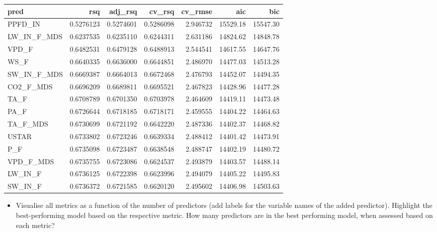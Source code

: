 \documentclass[
]{book}
\providecommand{\tightlist}{%
  \setlength{\itemsep}{0pt}\setlength{\parskip}{0pt}}
\begin{document}
\begin{tabular}{l|r|r|r|r|r|r}
\hline
pred & rsq & adj\_rsq & cv\_rsq & cv\_rmse & aic & bic\\
\hline
PPFD\_IN & 0.5276123 & 0.5274601 & 0.5286098 & 2.946732 & 15529.18 & 15547.30\\
\hline
LW\_IN\_F\_MDS & 0.6237535 & 0.6235110 & 0.6244311 & 2.631186 & 14824.62 & 14848.78\\
\hline
VPD\_F & 0.6482531 & 0.6479128 & 0.6488913 & 2.544541 & 14617.55 & 14647.76\\
\hline
WS\_F & 0.6640335 & 0.6636000 & 0.6644851 & 2.486970 & 14477.03 & 14513.28\\
\hline
SW\_IN\_F\_MDS & 0.6669387 & 0.6664013 & 0.6672468 & 2.476793 & 14452.07 & 14494.35\\
\hline
CO2\_F\_MDS & 0.6696209 & 0.6689811 & 0.6695521 & 2.467823 & 14428.96 & 14477.28\\
\hline
TA\_F & 0.6708789 & 0.6701350 & 0.6703978 & 2.464609 & 14419.11 & 14473.48\\
\hline
PA\_F & 0.6726644 & 0.6718185 & 0.6718171 & 2.459555 & 14404.22 & 14464.63\\
\hline
TA\_F\_MDS & 0.6730699 & 0.6721192 & 0.6642220 & 2.487336 & 14402.37 & 14468.82\\
\hline
USTAR & 0.6733802 & 0.6723246 & 0.6639334 & 2.488412 & 14401.42 & 14473.91\\
\hline
P\_F & 0.6735098 & 0.6723487 & 0.6638548 & 2.488747 & 14402.19 & 14480.72\\
\hline
VPD\_F\_MDS & 0.6735755 & 0.6723086 & 0.6624537 & 2.493879 & 14403.57 & 14488.14\\
\hline
LW\_IN\_F & 0.6736125 & 0.6722398 & 0.6623996 & 2.494079 & 14405.22 & 14495.83\\
\hline
SW\_IN\_F & 0.6736372 & 0.6721585 & 0.6620120 & 2.495602 & 14406.98 & 14503.63\\
\hline
\end{tabular}

\begin{itemize}
\tightlist
\item
  Visualise all metrics as a function of the number of predictors (add labels for the variable names of the added predictor). Highlight the best-performing model based on the respective metric. How many predictors are in the best performing model, when assessed based on each metric?
\end{itemize}
\end{document}
